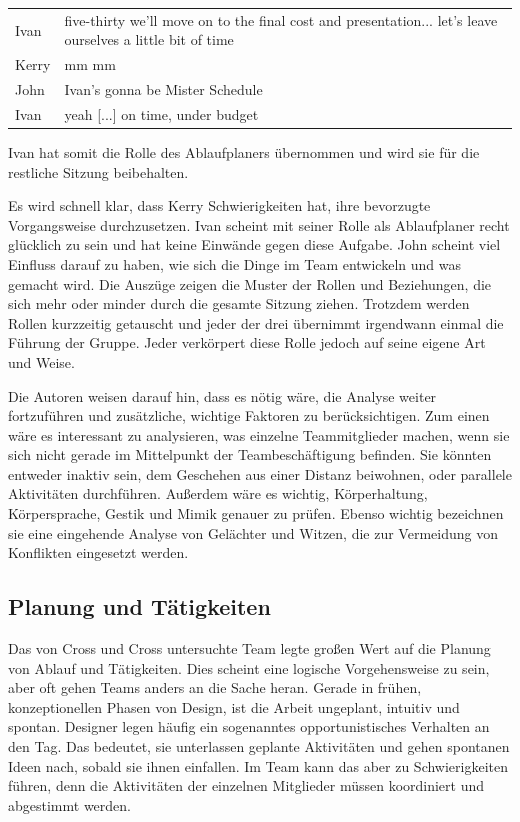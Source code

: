 \begin{extract}[John bestätigt Ivan erneut in seiner Rolle.]
	{
		\myfloatalign
		\begin{tabularx}{\textwidth}{p{1cm}X}
    		Ivan & five-thirty we'll move on to the final cost and presentation... let's leave ourselves a little bit of time \\
			Kerry & mm mm \\
			John & Ivan's gonna be Mister Schedule \\
			Ivan & yeah [...] on time, under budget
		\end{tabularx}
	}
\end{extract}

Ivan hat somit die Rolle des Ablaufplaners übernommen und wird sie für die restliche Sitzung beibehalten.

\medskip Es wird schnell klar, dass Kerry Schwierigkeiten hat, ihre bevorzugte Vorgangsweise durchzusetzen. Ivan scheint mit seiner Rolle als Ablaufplaner recht glücklich zu sein und hat keine Einwände gegen diese Aufgabe. John scheint viel Einfluss darauf zu haben, wie sich die Dinge im Team entwickeln und was gemacht wird. Die Auszüge zeigen die Muster der Rollen und Beziehungen, die sich mehr oder minder durch die gesamte Sitzung ziehen. Trotzdem werden Rollen kurzzeitig getauscht und jeder der drei übernimmt irgendwann einmal die Führung der Gruppe. Jeder verkörpert diese Rolle jedoch auf seine eigene Art und Weise.

Die Autoren weisen darauf hin, dass es nötig wäre, die Analyse weiter fortzuführen und zusätzliche, wichtige Faktoren zu berücksichtigen. Zum einen wäre es interessant zu analysieren, was einzelne Teammitglieder machen, wenn sie sich nicht gerade im Mittelpunkt der Teambeschäftigung befinden. Sie könnten entweder inaktiv sein, dem Geschehen aus einer Distanz beiwohnen, oder parallele Aktivitäten durchführen. Außerdem wäre es wichtig, Körperhaltung, Körpersprache, Gestik und Mimik genauer zu prüfen. Ebenso wichtig bezeichnen sie eine eingehende Analyse von Gelächter und Witzen, die zur Vermeidung von Konflikten eingesetzt werden.
\clearpage
\subsection{Planung und Tätigkeiten}\label{sec:collabActions} 

Das von Cross und Cross untersuchte Team legte großen Wert auf die Planung von Ablauf und Tätigkeiten. Dies scheint eine logische Vorgehensweise zu sein, aber oft gehen Teams anders an die Sache heran. Gerade in frühen, konzeptionellen Phasen von Design, ist die Arbeit ungeplant, intuitiv und spontan. Designer legen häufig ein sogenanntes opportunistisches Verhalten an den Tag. Das bedeutet, sie unterlassen geplante Aktivitäten und gehen spontanen Ideen nach, sobald sie ihnen einfallen. Im Team kann das aber zu Schwierigkeiten führen, denn die Aktivitäten der einzelnen Mitglieder müssen koordiniert und abgestimmt werden. 

